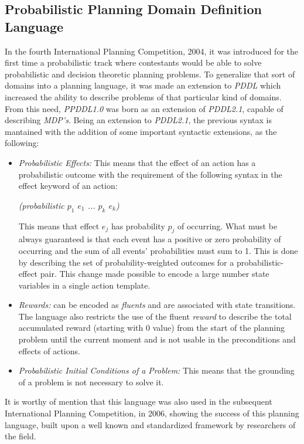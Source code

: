 \subsection{Probabilistic Planning Domain Definition Language}

In the fourth International Planning Competition, 2004, it was introduced for
the first time a probabilistic track where contestants would be able to solve
probabilistic and decision theoretic planning problems. To generalize
that sort of domains into a planning language, it was made an extension to
\textit{PDDL} which increased the ability to describe problems of that
particular kind of domains. From this need, \textit{PPDDL1.0} \cite{Younes2004}
was born as an extension of \textit{PDDL2.1}, capable of describing
\textit{MDP's}. Being an extension to \textit{PDDL2.1}, the previous syntax is
mantained with the addition of some important syntactic extensions, as the
following:
\begin{itemize}
    \item \textit{Probabilistic Effects: } This means that the effect of an
    action has a probabilistic outcome with the requirement of the following
    syntax in the effect keyword of an action:\\
    \centerline{\textit{(probabilistic $p_1$  $e_1$  ...  $p_k$  $e_k$)}}
    This means that effect $e_j$ has probability $p_j$ of occurring. What must
    be always guaranteed is that each event has a positive or zero probability
    of occurring and the sum of all events' probabilities must sum to 1. This is
    done by describing the set of probability-weighted outcomes for a
    probabilistic-effect pair. This change made possible to encode a large
    number state variables in a single action template.
    \item \textit{Rewards: }can be encoded as \textit{fluents} and are
    associated with state transitions. The language also restricts the use of
    the fluent \textit{reward} to describe the total accumulated reward
    (starting with 0 value) from the start of the planning problem until the
    current moment and is not usable in the preconditions and effects of
    actions.
    \item \textit{Probabilistic Initial Conditions of a Problem: }This means
    that the grounding of a problem is not necessary to solve it.
\end{itemize}

It is worthy of mention that this language was also used in the subsequent
International Planning Competition, in 2006, showing the success of this
planning language, built upon a well known and standardized framework by
researchers of the field.

